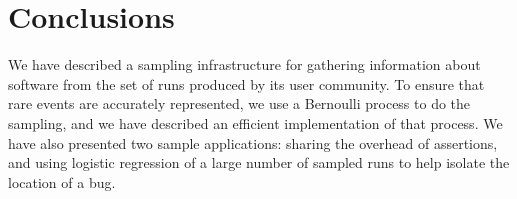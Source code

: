 \section{Conclusions}
\label{sec:conclusions}

We have described a sampling infrastructure for gathering information about
software from the set of runs produced by its user community.  To ensure
that rare events are accurately represented, we use a Bernoulli process to do the sampling,
and we have described an efficient implementation of that process.
We have also presented two sample applications: sharing the overhead of assertions, and 
using logistic regression of a large number of sampled runs to help isolate
the location of a bug.
